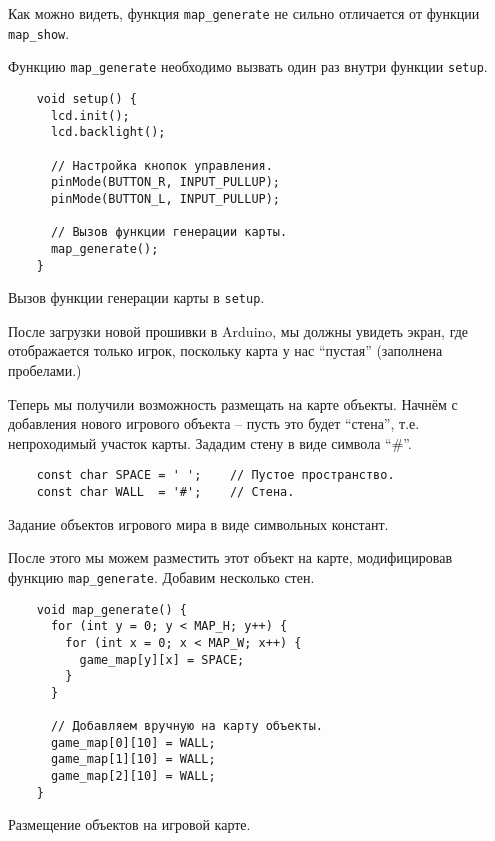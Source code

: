 \documentclass[../sparc.tex]{subfiles}
\begin{document}
Как можно видеть, функция \texttt{map\_generate} не сильно отличается от функции
\texttt{map\_show}.

Функцию \texttt{map\_generate} необходимо вызвать один раз внутри функции
\texttt{setup}.

\begin{listing}[H]
  \begin{verbatim}
    void setup() {
      lcd.init();
      lcd.backlight();

      // Настройка кнопок управления.
      pinMode(BUTTON_R, INPUT_PULLUP);
      pinMode(BUTTON_L, INPUT_PULLUP);

      // Вызов функции генерации карты.
      map_generate();
    }
  \end{verbatim}
  \caption{Вызов функции генерации карты в \texttt{setup}.}
  \label{listing:game-dev-map-generate-call}
\end{listing}

После загрузки новой прошивки в Arduino, мы должны увидеть экран, где
отображается только игрок, поскольку карта у нас ``пустая'' (заполнена
пробелами.)

Теперь мы получили возможность размещать на карте объекты.  Начнём с добавления
нового игрового объекта -- пусть это будет ``стена'', т.е. непроходимый участок
карты.  Зададим стену в виде символа ``\#''.

\begin{listing}[H]
  \begin{verbatim}
    const char SPACE = ' ';    // Пустое пространство.
    const char WALL  = '#';    // Стена.
  \end{verbatim}
  \caption{Задание объектов игрового мира в виде символьных констант.}
  \label{listing:game-dev-map-objects}
\end{listing}

После этого мы можем разместить этот объект на карте, модифицировав функцию
\texttt{map\_generate}.  Добавим несколько стен.

\begin{listing}[H]
  \begin{verbatim}
    void map_generate() {
      for (int y = 0; y < MAP_H; y++) {
        for (int x = 0; x < MAP_W; x++) {
          game_map[y][x] = SPACE;
        }
      }

      // Добавляем вручную на карту объекты.
      game_map[0][10] = WALL;
      game_map[1][10] = WALL;
      game_map[2][10] = WALL;
    }
  \end{verbatim}
  \caption{Размещение объектов на игровой карте.}
  \label{listing:game-dev-map-objects-set}
\end{listing}
\end{document}
